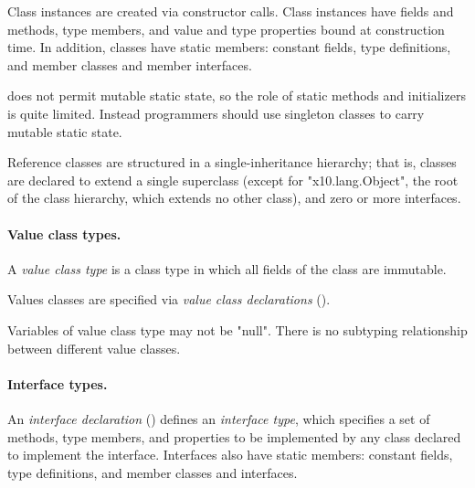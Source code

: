         Class instances are created via
        constructor calls.  Class instances have fields and
        methods, type members, and value and type properties bound at
        construction time.  In addition, classes have static
        members: constant fields, type definitions, and member
        classes and member interfaces.

\Xten{} does
not
permit mutable static state, so the role of static methods and
initializers is quite limited. Instead programmers should use
singleton classes to carry mutable static state.
        
        Reference classes are structured in a
        single-inheritance hierarchy; that is,
        classes are declared to extend a single
        superclass (except for \xcd"x10.lang.Object", the root
        of the class hierarchy, which extends no other class),
        and zero or more interfaces.

\paragraph{Value class types.}


A {\em value class type}
is a class type in which all fields of the class are immutable.

Values classes are specified via {\em value class declarations}
().

Variables of value class type may not be \xcd"null".
There is no subtyping relationship between different value
classes.

\paragraph{Interface types.}


        An {\em interface declaration} ()
        defines an {\em interface type}, which specifies a set of
        methods, type members, and properties to be implemented by any class
        declared to implement the interface.  Interfaces also
        have static members: constant fields, type definitions,
        and member classes and interfaces.


